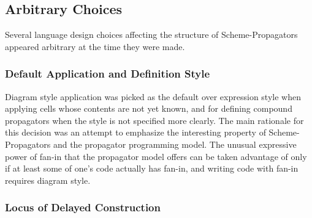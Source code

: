 \documentclass[12pt,letterpaper,english]{article}
\begin{document}

\hypertarget{arbitrary-choices}{}
\subsection{Arbitrary Choices}
\label{arbitrary-choices}

Several language design choices affecting the structure of
Scheme-Propagators appeared arbitrary at the time they were made.



\hypertarget{default-application-and-definition-style}{}
\subsubsection{Default Application and Definition Style}
\label{default-application-and-definition-style}

Diagram style application was picked as the default over
expression style when applying cells whose contents are not yet known,
and for defining compound propagators when the style is not specified
more clearly.  The main rationale for this decision was an attempt to
emphasize the interesting property of Scheme-Propagators and the
propagator programming model.  The unusual expressive power of fan-in
that the propagator model offers can be taken advantage of only if at
least some of one's code actually has fan-in, and writing code with
fan-in requires diagram style.



\hypertarget{locus-of-delayed-construction}{}
\subsubsection{Locus of Delayed Construction}
\label{locus-of-delayed-construction}
\end{document}

